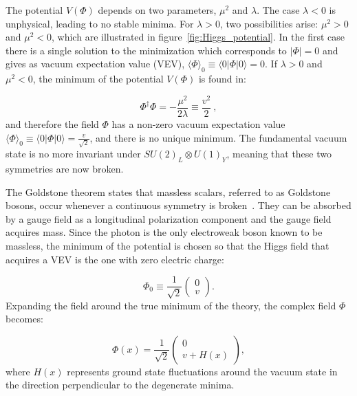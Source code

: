 The potential $V(\Phi)$ depends on two parameters, $\mu^2$ and $\lambda$. The case $\lambda < 0$ is unphysical, leading to no stable minima. For $\lambda > 0$, two possibilities arise: $\mu^2 > 0$ and $\mu^2 < 0$, which are illustrated in figure~\ref{fig:Higgs_potential}. In the first case there is a single solution to the minimization which corresponds to $|\Phi| =0$ and gives as vacuum expectation value (VEV), $\langle\Phi\rangle_0 \equiv \langle0|\Phi|0\rangle = 0$.
If $\lambda>0$ and $\mu^2<0$, the minimum of the potential $V(\Phi)$ is found in:

\begin{equation}
  \Phi^{\dagger} \Phi = -\frac{\mu^2}{2\lambda} \equiv \frac{v^2}{2}~,
  \label{eq:HiggsMinimumOfPotential}
\end{equation}
and therefore the field $\Phi$ has a non-zero vacuum expectation value $\langle\Phi\rangle_0 \equiv \langle0|\Phi|0\rangle = \frac{v}{\sqrt{2}}$, and there is no unique minimum. The fundamental vacuum state is no more invariant under $SU(2)_L \otimes U(1)_Y$, meaning that these two symmetries are now broken.

The Goldstone theorem states that massless scalars, referred to as Goldstone bosons, occur whenever a continuous symmetry is broken~\cite{PhysRev.127.965}.
They can be absorbed by a gauge field as a longitudinal polarization component and the gauge field acquires mass.
Since the photon is the only electroweak boson known to be massless, the minimum of the potential is chosen so that the Higgs field that acquires a VEV is the one with zero electric charge:

\begin{equation}
  \Phi_0 \equiv \frac{1}{\sqrt{2}} \left(
  \begin{matrix}
    0 \\
    v
  \end{matrix}
  \right).
  \label{eq:VEVdefinition}
\end{equation}
Expanding the field around the true minimum of the theory, the complex field $\Phi$ becomes:

\begin{equation}
  \Phi(x) = 
  \frac{1}{\sqrt{2}} \left(
  \begin{matrix}
    0 \\
    v + H(x)
  \end{matrix}
  \right),
  \label{eq:HiggsField}
\end{equation}
where $H(x)$ represents ground state fluctuations around the vacuum state in the direction perpendicular to the degenerate minima.

